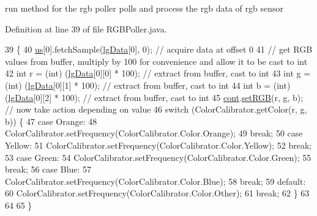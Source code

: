 run method for the rgb poller polls and process the rgb data of rgb sensor 

Definition at line 39 of file R\+G\+B\+Poller.\+java.


\begin{DoxyCode}
39                              \{
40     \hyperlink{classca_1_1mcgill_1_1ecse211_1_1threads_1_1_light_poller_ab6a9cb770bbf71f586697633db1475ff}{us}[0].fetchSample(\hyperlink{classca_1_1mcgill_1_1ecse211_1_1threads_1_1_light_poller_a6cf53aecc3efc481f71d36341d2276c6}{lgData}[0], 0); \textcolor{comment}{// acquire data at offset 0}
41     \textcolor{comment}{// get RGB values from buffer, multiply by 100 for convenience and allow it to be cast to int}
42     \textcolor{keywordtype}{int} r = (int) (\hyperlink{classca_1_1mcgill_1_1ecse211_1_1threads_1_1_light_poller_a6cf53aecc3efc481f71d36341d2276c6}{lgData}[0][0] * 100); \textcolor{comment}{// extract from buffer, cast to int}
43     \textcolor{keywordtype}{int} g = (int) (\hyperlink{classca_1_1mcgill_1_1ecse211_1_1threads_1_1_light_poller_a6cf53aecc3efc481f71d36341d2276c6}{lgData}[0][1] * 100); \textcolor{comment}{// extract from buffer, cast to int}
44     \textcolor{keywordtype}{int} b = (int) (\hyperlink{classca_1_1mcgill_1_1ecse211_1_1threads_1_1_light_poller_a6cf53aecc3efc481f71d36341d2276c6}{lgData}[0][2] * 100); \textcolor{comment}{// extract from buffer, cast to int}
45     \hyperlink{classca_1_1mcgill_1_1ecse211_1_1threads_1_1_light_poller_ab6a9050ced4f6940add4735c8872194a}{cont}.\hyperlink{classca_1_1mcgill_1_1ecse211_1_1threads_1_1_sensor_data_a6ad23111ecd378099f0b4ed0b6d398bc}{setRGB}(r, g, b); \textcolor{comment}{// now take action depending on value}
46     \textcolor{keywordflow}{switch} (ColorCalibrator.getColor(r, g, b)) \{
47       \textcolor{keywordflow}{case} Orange:
48         ColorCalibrator.setFrequency(ColorCalibrator.Color.Orange);
49         \textcolor{keywordflow}{break};
50       \textcolor{keywordflow}{case} Yellow:
51         ColorCalibrator.setFrequency(ColorCalibrator.Color.Yellow);
52         \textcolor{keywordflow}{break};
53       \textcolor{keywordflow}{case} Green:
54         ColorCalibrator.setFrequency(ColorCalibrator.Color.Green);
55         \textcolor{keywordflow}{break};
56       \textcolor{keywordflow}{case} Blue:
57         ColorCalibrator.setFrequency(ColorCalibrator.Color.Blue);
58         \textcolor{keywordflow}{break};
59       \textcolor{keywordflow}{default}:
60         ColorCalibrator.setFrequency(ColorCalibrator.Color.Other);
61         \textcolor{keywordflow}{break};
62     \}
63     
64     
65   \}
\end{DoxyCode}
